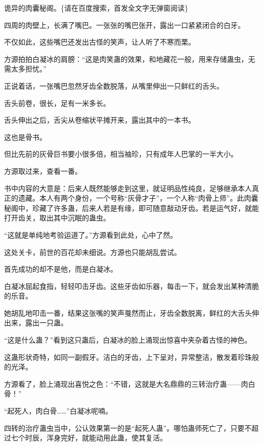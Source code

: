 
\begin{this_body}



诡异的肉囊秘阁。\{请在百度搜索，首发全文字无弹窗阅读\}

四周的肉壁上，长满了嘴巴。一张张的嘴巴张开，露出一口紧紧闭合的白牙。

不仅如此，这些嘴巴还发出古怪的笑声，让人听了不寒而栗。

方源拍拍白凝冰的肩膀：“这是肉笑蛊的效果，和地藏花一般，用来存储蛊虫，无需太多担忧。”

正说着话，一张嘴巴忽然牙齿全数脱落，从嘴里伸出一只鲜红的舌头。

舌头前卷，很长，足有一米多长。

舌头伸出之后，舌尖从卷缩状平摊开来，露出其中的一本书。

这也是骨书。

但比先前的灰骨巨书要小很多倍，相当袖珍，只有成年人巴掌的一半大小。

方源取过来，查看一番。

书中内容的大意是：后来人既然能够走到这里，就证明品性纯良，足够继承本人真正的遗藏。本人有两个身份，一个号称“灰骨才子”，一个人称“肉骨上师”。此肉囊秘阁中，珍藏了许多蛊，后来人若是有缘，即可随意敲动牙齿。若是运气好，就能打开齿关，取出其中沉眠的蛊虫。

“这就是单纯地考验运道了。”方源看到此处，心中了然。

这处关卡，前世的百花却未细说。方源也只能胡乱尝试。

首先成功的却不是他，而是白凝冰。

白凝冰屈起食指，轻轻叩击牙齿。这些牙齿如乐器，每击一下，就会发出某种清脆的乐音。

她胡乱地叩击一番，结果这张嘴的笑声戛然而止，牙齿全数脱离，鲜红的大舌头伸出来，露出一只蛊。

“这是什么蛊？”看到这只蛊后，白凝冰的脸上涌现出惊喜中夹杂着古怪的神色。

这蛊形状奇特，如同一副假牙。洁白的牙齿，上下呈对，异常整洁，散发着珍珠般的光泽。

方源看了，脸上涌现出喜悦之色：“不错，这就是大名鼎鼎的三转治疗蛊——肉白骨！”

“起死人，肉白骨……”白凝冰呢喃。

四转的治疗蛊虫当中，公认效果第一的是“起死人蛊”。哪怕蛊师死亡了，只要不超过七个时辰，浑身完好，就能动用此蛊，使其复活。


\end{this_body}
